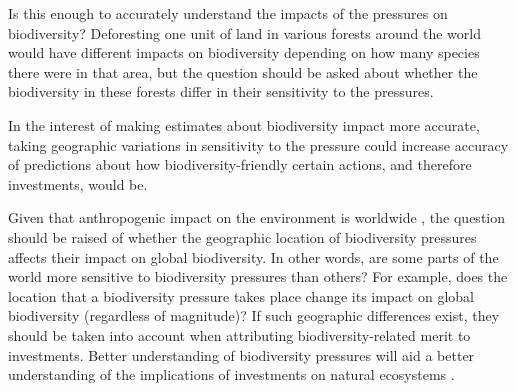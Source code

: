 \documentclass[11pt, a4paper, titlepage]{article}
\begin{document}
   	 
   	  \newline
   	 
   	 Is this enough to accurately understand the impacts of the pressures on biodiversity? Deforesting one unit of land in various forests around the world would have different impacts on biodiversity depending on how many species there were in that area, but the question should be asked about whether the biodiversity in these forests differ in their sensitivity to the pressures.  \newline
   	 
   	 In the interest of making estimates about biodiversity impact more accurate, taking geographic variations in sensitivity to the pressure could increase accuracy of predictions about how biodiversity-friendly certain actions, and therefore investments, would be.  \newline
   	 
   	 Given that anthropogenic impact on the environment is worldwide \cite{plumptre2021might}, the question should be raised of whether the geographic location of biodiversity pressures affects their impact on global biodiversity. In other words, are some parts of the world more sensitive to biodiversity pressures than others? For example, does the location that a biodiversity pressure takes place change its impact on global biodiversity (regardless of magnitude)? If such geographic differences exist, they should be taken into account when attributing biodiversity-related merit to investments. Better understanding of biodiversity pressures will aid a better understanding of the implications of investments on natural ecosystems . \newline
   	
   	\newpage
\end{document}
